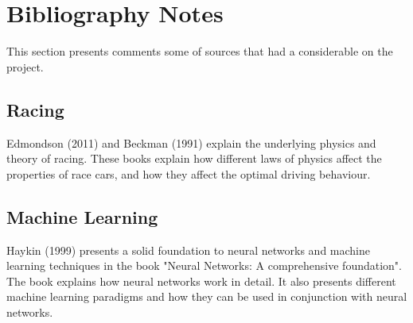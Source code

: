 









\section{Bibliography Notes}

This section presents comments some of sources that had a considerable on the project.

\subsection{Racing}
Edmondson (2011) and Beckman (1991) explain the underlying physics and theory of racing. These books explain how different laws of physics affect the properties of race cars, and how they affect the optimal driving behaviour. 


\subsection{Machine Learning}

Haykin (1999) presents a solid foundation to neural networks and machine learning techniques in the book "Neural Networks: A comprehensive foundation". The book explains how neural networks work in detail. It also presents different machine learning paradigms and how they can be used in conjunction with neural networks. 

